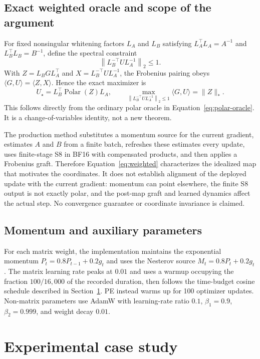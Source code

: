 \documentclass[10pt]{article}
\newcommand{\SN}[1]{\left\lVert #1\right\rVert_2}
\begin{document}
\subsection{Exact weighted oracle and scope of the argument}
For fixed nonsingular whitening factors $L_A$ and $L_B$ satisfying $L_A^\top L_A=A^{-1}$ and $L_B^\top L_B=B^{-1}$, define the spectral constraint
\begin{equation}
 \SN{L_B^{-\top} U L_A^{-1}}\leq 1.
\end{equation}
With $Z=L_B G L_A^\top$ and $X=L_B^{-\top}UL_A^{-1}$, the Frobenius pairing obeys $\langle G,U\rangle=\langle Z,X\rangle$. Hence the exact maximizer is
\begin{equation}\label{eq:weighted}
 U_\star=L_B^\top\operatorname{Polar}(Z)L_A,\qquad
 \max_{\SN{L_B^{-\top}UL_A^{-1}}\leq1}\langle G,U\rangle=\|Z\|_*.
\end{equation}
This follows directly from the ordinary polar oracle in Equation~\eqref{eq:polar-oracle}. It is a change-of-variables identity, not a new theorem.

The production method substitutes a momentum source for the current gradient, estimates $A$ and $B$ from a finite batch, refreshes these estimates every update, uses finite-stage S8 in BF16 with compensated products, and then applies a Frobenius graft. Therefore Equation~\eqref{eq:weighted} characterizes the idealized map that motivates the coordinates. It does not establish alignment of the deployed update with the current gradient: momentum can point elsewhere, the finite S8 output is not exactly polar, and the post-map graft and learned dynamics affect the actual step. No convergence guarantee or coordinate invariance is claimed.

\subsection{Momentum and auxiliary parameters}
For each matrix weight, the implementation maintains the exponential momentum $P_t=0.8P_{t-1}+0.2g_t$ and uses the Nesterov source $M_t=0.8P_t+0.2g_t$. The matrix learning rate peaks at $0.01$ and uses a warmup occupying the fraction $100/16{,}000$ of the recorded duration, then follows the time-budget cosine schedule described in Section~\ref{sec:experiment}. PE instead warms up for 100 optimizer updates. Non-matrix parameters use AdamW \citep{loshchilov2017adamw} with learning-rate ratio $0.1$, $\beta_1=0.9$, $\beta_2=0.999$, and weight decay $0.01$.

\section{Experimental case study}\label{sec:experiment}
\end{document}
